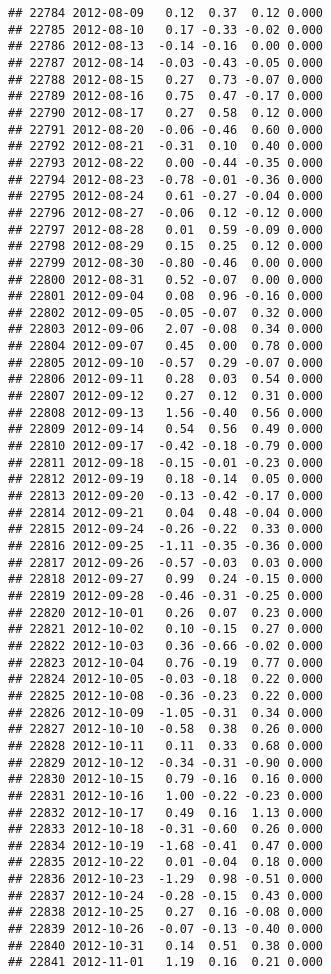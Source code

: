 \documentclass[
]{article}
\begin{document}
\begin{verbatim}
## 22784 2012-08-09   0.12  0.37  0.12 0.000
## 22785 2012-08-10   0.17 -0.33 -0.02 0.000
## 22786 2012-08-13  -0.14 -0.16  0.00 0.000
## 22787 2012-08-14  -0.03 -0.43 -0.05 0.000
## 22788 2012-08-15   0.27  0.73 -0.07 0.000
## 22789 2012-08-16   0.75  0.47 -0.17 0.000
## 22790 2012-08-17   0.27  0.58  0.12 0.000
## 22791 2012-08-20  -0.06 -0.46  0.60 0.000
## 22792 2012-08-21  -0.31  0.10  0.40 0.000
## 22793 2012-08-22   0.00 -0.44 -0.35 0.000
## 22794 2012-08-23  -0.78 -0.01 -0.36 0.000
## 22795 2012-08-24   0.61 -0.27 -0.04 0.000
## 22796 2012-08-27  -0.06  0.12 -0.12 0.000
## 22797 2012-08-28   0.01  0.59 -0.09 0.000
## 22798 2012-08-29   0.15  0.25  0.12 0.000
## 22799 2012-08-30  -0.80 -0.46  0.00 0.000
## 22800 2012-08-31   0.52 -0.07  0.00 0.000
## 22801 2012-09-04   0.08  0.96 -0.16 0.000
## 22802 2012-09-05  -0.05 -0.07  0.32 0.000
## 22803 2012-09-06   2.07 -0.08  0.34 0.000
## 22804 2012-09-07   0.45  0.00  0.78 0.000
## 22805 2012-09-10  -0.57  0.29 -0.07 0.000
## 22806 2012-09-11   0.28  0.03  0.54 0.000
## 22807 2012-09-12   0.27  0.12  0.31 0.000
## 22808 2012-09-13   1.56 -0.40  0.56 0.000
## 22809 2012-09-14   0.54  0.56  0.49 0.000
## 22810 2012-09-17  -0.42 -0.18 -0.79 0.000
## 22811 2012-09-18  -0.15 -0.01 -0.23 0.000
## 22812 2012-09-19   0.18 -0.14  0.05 0.000
## 22813 2012-09-20  -0.13 -0.42 -0.17 0.000
## 22814 2012-09-21   0.04  0.48 -0.04 0.000
## 22815 2012-09-24  -0.26 -0.22  0.33 0.000
## 22816 2012-09-25  -1.11 -0.35 -0.36 0.000
## 22817 2012-09-26  -0.57 -0.03  0.03 0.000
## 22818 2012-09-27   0.99  0.24 -0.15 0.000
## 22819 2012-09-28  -0.46 -0.31 -0.25 0.000
## 22820 2012-10-01   0.26  0.07  0.23 0.000
## 22821 2012-10-02   0.10 -0.15  0.27 0.000
## 22822 2012-10-03   0.36 -0.66 -0.02 0.000
## 22823 2012-10-04   0.76 -0.19  0.77 0.000
## 22824 2012-10-05  -0.03 -0.18  0.22 0.000
## 22825 2012-10-08  -0.36 -0.23  0.22 0.000
## 22826 2012-10-09  -1.05 -0.31  0.34 0.000
## 22827 2012-10-10  -0.58  0.38  0.26 0.000
## 22828 2012-10-11   0.11  0.33  0.68 0.000
## 22829 2012-10-12  -0.34 -0.31 -0.90 0.000
## 22830 2012-10-15   0.79 -0.16  0.16 0.000
## 22831 2012-10-16   1.00 -0.22 -0.23 0.000
## 22832 2012-10-17   0.49  0.16  1.13 0.000
## 22833 2012-10-18  -0.31 -0.60  0.26 0.000
## 22834 2012-10-19  -1.68 -0.41  0.47 0.000
## 22835 2012-10-22   0.01 -0.04  0.18 0.000
## 22836 2012-10-23  -1.29  0.98 -0.51 0.000
## 22837 2012-10-24  -0.28 -0.15  0.43 0.000
## 22838 2012-10-25   0.27  0.16 -0.08 0.000
## 22839 2012-10-26  -0.07 -0.13 -0.40 0.000
## 22840 2012-10-31   0.14  0.51  0.38 0.000
## 22841 2012-11-01   1.19  0.16  0.21 0.000

\end{verbatim}
\end{document}
